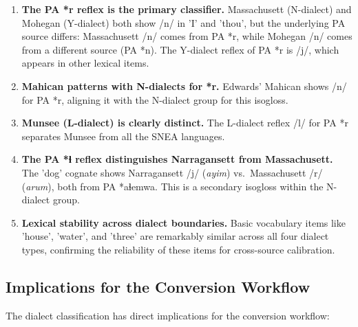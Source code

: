 \begin{enumerate}
  \item \textbf{The PA *r reflex is the primary classifier.} Massachusett
    (N-dialect) and Mohegan (Y-dialect) both show /n/ in 'I' and 'thou',
    but the underlying PA source differs: Massachusett /n/ comes from PA *r,
    while Mohegan /n/ comes from a different source (PA *n). The Y-dialect
    reflex of PA *r is /j/, which appears in other lexical items.

  \item \textbf{Mahican patterns with N-dialects for *r.} Edwards' Mahican
    shows /n/ for PA *r, aligning it with the N-dialect group for this
    isogloss.

  \item \textbf{Munsee (L-dialect) is clearly distinct.} The L-dialect
    reflex /l/ for PA *r separates Munsee from all the SNEA languages.

  \item \textbf{The PA *ɬ reflex distinguishes Narragansett from
    Massachusett.} The 'dog' cognate shows Narragansett /j/ (\textit{ayim})
    vs.\ Massachusett /r/ (\textit{arum}), both from PA *aɬemwa. This is a
    secondary isogloss within the N-dialect group.

  \item \textbf{Lexical stability across dialect boundaries.} Basic
    vocabulary items like 'house', 'water', and 'three' are remarkably
    similar across all four dialect types, confirming the reliability of
    these items for cross-source calibration.
\end{enumerate}

\subsection{Implications for the Conversion Workflow}

The dialect classification has direct implications for the conversion
workflow:

